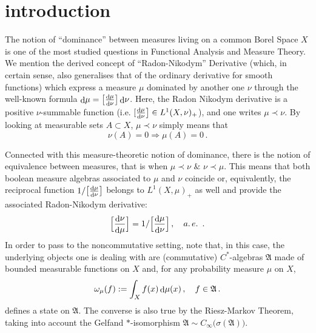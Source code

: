 \documentclass[12pt]{amsart}
\numberwithin{equation}{section}
\def\ga{{\mathfrak A}} \def\gpa{{\mathfrak a}}
\def\m{\mu}
\def\n{\nu}
\def\s{\sigma} \def\S{\Sigma}
\def\om{\omega} \def\Om{\Omega}
\def\di{\mathop{\rm d}\!}
\begin{document}
\maketitle

\section{introduction}

The notion of ``dominance'' between measures living on a common Borel Space $X$ is one of the most studied questions in Functional Analysis and Measure Theory. We mention the derived concept of ``Radon-Nikodym'' Derivative (which, in certain sense, also generalises that of the ordinary derivative for smooth functions) which express a measure $\m$ dominated by another one $\n$ through the well-known formula $\di\m=\big[\frac{\di\m}{\di\n}\big]\di\n$. Here, the Radon Nikodym derivative is a positive $\n$-summable function (i.e. $[\frac{\di\m}{\di\n}\big]\in L^1(X,\n)_+$), and
one writes $\m\prec\n$. By looking at measurable sets $A\subset X$, $\m\prec\n$ simply means that 
\begin{equation}
\label{mnust}
\n(A)=0\Rightarrow \m(A)=0\,.
\end{equation}

Connected with this measure-theoretic notion of dominance, there is the notion of equivalence between measures, that is when $\m\prec\n\,\,\&\,\, \n\prec\m$. This means that both boolean measure algebras associated to $\m$ and $\n$ coincide or, equivalently, the reciprocal function $1/\big[\frac{\di\m}{\di\n}\big]$ belongs to $L^1(X,\m)_+$ as well and provide the associated Radon-Nikodym derivative: 
$$
\Big[\frac{\di\n}{\di\m}\Big]=1/\Big[\frac{\di\m}{\di\n}\Big]\,,\quad a.\,e.\,\,\,.
$$
In order to pass to the noncommutative setting, note that, in this case, the underlying objects one is dealing with are (commutative) $C^*$-algebras $\ga$ made of bounded measurable functions on $X$ and, for any probability measure $\m$ on $X$, 
$$
\om_\m(f):=\int_X f(x)\di\m(x)\,,\quad f\in\ga\,.
$$
defines a state on $\ga$. The converse is also true by the Riesz-Markov Theorem, taking into account the Gelfand $*$-isomorphism 
$\ga\sim C_\infty\big(\s(\ga)\big)$.
\end{document}
